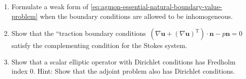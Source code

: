 \begin{enumerate}[label=\thesection.\arabic*.,ref=\thesection.\arabic*,start=5,series=book-problems]
\item\label{ex:inhomogeneous-essential-natural-boundaries-weak-form} Formulate a weak form of \eqref{eq:agmon-essential-natural-boundary-value-problem} when the boundary conditions are allowed to be inhomogeneous.

\item\label{ex:stokes-traction-complementing-condition} Show that the ``traction boundary conditions\textquotesingle\textquotesingle\ $(\nabla\bm{u}+(\nabla\bm{u})^{\mathrm{T}})\cdot\bm{n}-p\bm{n}=0$ satisfy the complementing condition for the Stokes system.

\item\label{ex:scalar-dirichlet-zero-fredholm-index} Show that a scalar elliptic operator with Dirichlet conditions has Fredholm index $0$. Hint: Show that the adjoint problem also has Dirichlet conditions.

\end{enumerate}
